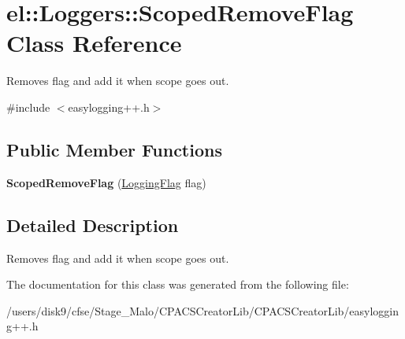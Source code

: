 \hypertarget{classel_1_1Loggers_1_1ScopedRemoveFlag}{\section{el\-:\-:Loggers\-:\-:Scoped\-Remove\-Flag Class Reference}
\label{classel_1_1Loggers_1_1ScopedRemoveFlag}
}


Removes flag and add it when scope goes out.  




{\ttfamily \#include $<$easylogging++.\-h$>$}

\subsection*{Public Member Functions}
\begin{DoxyCompactItemize}
\item 
\hypertarget{classel_1_1Loggers_1_1ScopedRemoveFlag_a7ae9a1cde34e1145d8b90b639cc12dc1}{{\bfseries Scoped\-Remove\-Flag} (\hyperlink{namespaceel_a2784aacd04cb7816ac1c0b20fcbf83cb}{Logging\-Flag} flag)}\label{classel_1_1Loggers_1_1ScopedRemoveFlag_a7ae9a1cde34e1145d8b90b639cc12dc1}

\end{DoxyCompactItemize}


\subsection{Detailed Description}
Removes flag and add it when scope goes out. 

The documentation for this class was generated from the following file\-:\begin{DoxyCompactItemize}
\item 
/users/disk9/cfse/\-Stage\-\_\-\-Malo/\-C\-P\-A\-C\-S\-Creator\-Lib/\-C\-P\-A\-C\-S\-Creator\-Lib/easylogging++.\-h\end{DoxyCompactItemize}
